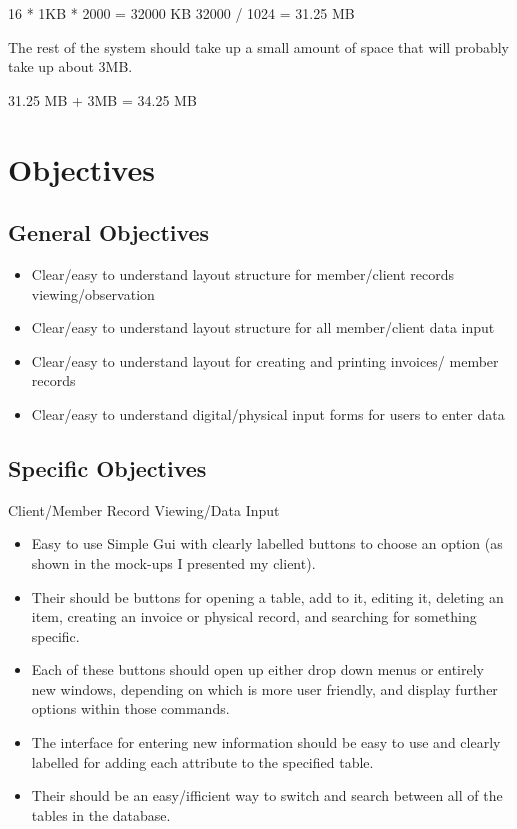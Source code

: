 16 * 1KB * 2000 = 32000 KB
32000 / 1024 = 31.25 MB

The rest of the system should take up a small amount of space that will probably take up about 3MB.

31.25 MB + 3MB = 34.25 MB

\section{Objectives}

\subsection{General Objectives}

    \begin{itemize}  

        \item Clear/easy to understand layout structure for member/client records viewing/observation 

        \item Clear/easy to understand layout structure for all member/client data input  

        \item Clear/easy to understand layout for creating and printing invoices/ member records
        
        \item Clear/easy to understand digital/physical input forms for users to enter data

    \end{itemize}

\subsection{Specific Objectives}

Client/Member Record Viewing/Data Input

\begin{itemize}  

        \item Easy to use Simple Gui with clearly labelled buttons to choose an option (as shown in the mock-ups I presented my client).
        \item Their should be buttons for opening a table, add to it, editing it, deleting an item, creating an invoice or physical record, and searching for something specific.
        \item Each of these buttons should open up either drop down menus or entirely new windows, depending on which is more user friendly, and display further options within those commands.
        \item The interface for entering new information should be easy to use and clearly labelled for adding each attribute to the specified table.
        \item Their should be an easy/ifficient way to switch and search between all of the tables in the database.
    \end{itemize}


